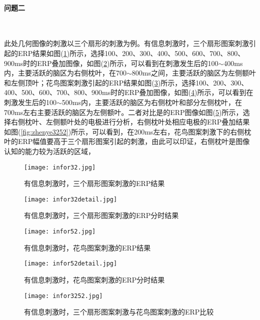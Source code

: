 \documentclass{hitreport}
\begin{document}
\paragraph{问题二}~{}

此处几何图像的刺激以三个扇形的刺激为例。有信息刺激时，三个扇形图案刺激引起的ERP结果如图(\ref{fig:infor32})所示，选择100、200、300、400、500、600、700、800、900ms时的ERP叠加图像，如图(\ref{fig:infor32detail})所示，可以看到在刺激发生后的100$\sim$400ms内，主要活跃的脑区为右侧枕叶，在700$\sim$800ms之间，主要活跃的脑区为左侧额叶和左侧顶叶；花鸟图案刺激引起的ERP结果如图(\ref{fig:infor52})所示，选择100、200、300、400、500、600、700、800、900ms时的ERP叠加图像，如图(\ref{fig:infor52detail})所示，可以看到在刺激发生后的100$\sim$500ms内，主要活跃的脑区为右侧枕叶和部分左侧枕叶，在700ms左右主要活跃的脑区为左侧额叶。二者对比是的ERP图像如图(\ref{fig:infor3252})所示，选择右侧枕叶、左侧额叶处的电极进行分析，右侧枕叶处相应电极的ERP叠加结果如图(\ref{fig:zhenye3252})所示，可以看到，在200ms左右，花鸟图案刺激下的右侧枕叶的ERP幅值要高于三个扇形图案引起的刺激，由此可以印证，右侧枕叶是图像认知的能力较为活跃的区域，

\begin{figure}[htb]
\centering
\texttt{[image: infor32.jpg]}
\caption{有信息刺激时，三个扇形图案刺激的ERP结果}\label{fig:infor32}
\end{figure}

\begin{figure}[htb]
\centering\texttt{[image: infor32detail.jpg]}
\caption{有信息刺激时，三个扇形图案刺激的ERP分时结果}\label{fig:infor32detail}
\end{figure}

\begin{figure}[htb]
\centering
\texttt{[image: infor52.jpg]}
\caption{有信息刺激时，花鸟图案刺激的ERP结果}\label{fig:infor52}
\end{figure}

\begin{figure}[htb]
\centering
\texttt{[image: infor52detail.jpg]}
\caption{有信息刺激时，花鸟图案刺激的ERP分时结果}\label{fig:infor52detail}
\end{figure}

\begin{figure}[htb]
\centering
\texttt{[image: infor3252.jpg]}
\caption{有信息刺激时，三个扇形图案刺激与花鸟图案刺激的ERP比较}\label{fig:infor3252}
\end{figure}
\end{document}
